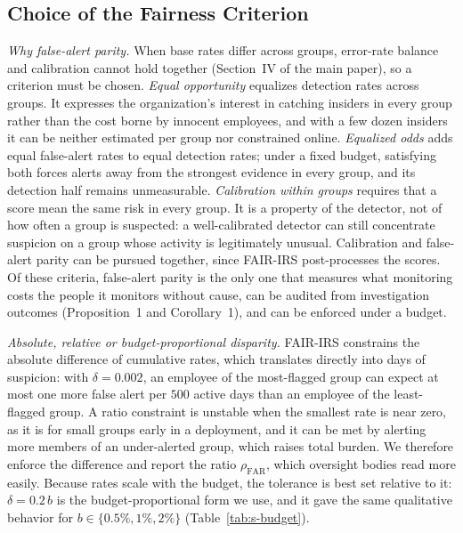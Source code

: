 \documentclass[10pt,onecolumn,letterpaper]{article}
\newcommand{\FAR}{\mathrm{FAR}}
\begin{document}
\subsection{Choice of the Fairness Criterion}
\label{sec:s-criterion}
\emph{Why false-alert parity.} When base rates differ across groups, error-rate balance and calibration cannot hold together (Section~IV of the main paper), so a criterion must be chosen. \emph{Equal opportunity} equalizes detection rates across groups. It expresses the organization's interest in catching insiders in every group rather than the cost borne by innocent employees, and with a few dozen insiders it can be neither estimated per group nor constrained online. \emph{Equalized odds} adds equal false-alert rates to equal detection rates; under a fixed budget, satisfying both forces alerts away from the strongest evidence in every group, and its detection half remains unmeasurable. \emph{Calibration within groups} requires that a score mean the same risk in every group. It is a property of the detector, not of how often a group is suspected: a well-calibrated detector can still concentrate suspicion on a group whose activity is legitimately unusual. Calibration and false-alert parity can be pursued together, since FAIR-IRS post-processes the scores. Of these criteria, false-alert parity is the only one that measures what monitoring costs the people it monitors without cause, can be audited from investigation outcomes (Proposition~1 and Corollary~1), and can be enforced under a budget.

\emph{Absolute, relative or budget-proportional disparity.} FAIR-IRS constrains the absolute difference of cumulative rates, which translates directly into days of suspicion: with $\delta=0.002$, an employee of the most-flagged group can expect at most one more false alert per $500$ active days than an employee of the least-flagged group. A ratio constraint is unstable when the smallest rate is near zero, as it is for small groups early in a deployment, and it can be met by alerting more members of an under-alerted group, which raises total burden. We therefore enforce the difference and report the ratio $\rho_{\FAR}$, which oversight bodies read more easily. Because rates scale with the budget, the tolerance is best set relative to it: $\delta=0.2\,b$ is the budget-proportional form we use, and it gave the same qualitative behavior for $b\in\{0.5\%,1\%,2\%\}$ (Table~\ref{tab:s-budget}).
\end{document}
